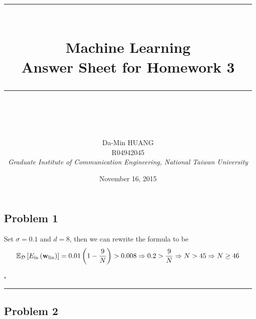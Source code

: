 \documentclass[12pt]{article}
\newcommand*{\QEDB}{\hfill\ensuremath{\square}}
\newcommand{\SBrackets}[1]{\left[#1\right]}
\newcommand{\ParTh}[1]{\left(#1\right)}
\newcommand{\BF}[1]{{\bf#1}}
\newcommand{\horrule}[1]{\rule{\linewidth}{#1}}
\begin{document}
\baselineskip 6.5mm
\setlength{\parindent}{0pt}
\title{ 
\normalfont \normalsize 
\horrule{0.5pt} \\[0.4cm]
\huge { \Huge Machine Learning \\ \large Answer Sheet for Homework 3 }\\ %
\horrule{2pt} \\ [0.5cm]
}
\author{ { \Large Da-Min HUANG } \\
{\small R04942045} \\
{\small\textit{Graduate Institute of Communication Engineering, National Taiwan University}}
}
\date{November 16, 2015}
\maketitle

\subsection*{Problem 1}

Set $\sigma=0.1$ and $d=8$, then we can rewrite the formula to be
\begin{align}
\mathbb{E}_{\mathcal{D}}\SBrackets{E_{\text{in}}\ParTh{\BF{w}_{\text{lin}}}}=0.01\ParTh{1-\dfrac{9}{N}}>0.008\Rightarrow0.2>\dfrac{9}{N}\Rightarrow N>45\Rightarrow N \geq 46
\end{align}

\QEDB

\horrule{0.5pt}

\subsection*{Problem 2}
\end{document}
